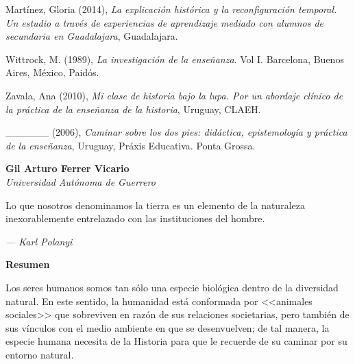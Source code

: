  
Martínez, Gloria (2014), \textit{La explicación histórica y la reconfiguración 
temporal. Un estudio a través de experiencias de aprendizaje mediado 
con alumnos de secundaria en Guadalajara}, Guadalajara.

 
Wittrock, M. (1989), \textit{La investigación de la enseñanza}. Vol I. 
Barcelona, Buenos Aires, México, Paidós.

 
Zavala, Ana (2010), \textit{Mi clase de historia bajo la lupa. Por un abordaje 
clínico de la práctica de la enseñanza de la historia}, Uruguay, CLAEH\@.

 
\_\_\_\_\_\_ (2006), \textit{Caminar sobre los dos pies: didáctica, 
epistemología y práctica de la enseñanza}, Uruguay, Práxis Educativa. 
Ponta Grossa.

%

\thispagestyle{empty}	
{}
{}


\bigskip
\begin{center}
{\bfseries Gil Arturo Ferrer Vicario}\\
{\itshape Universidad Autónoma de Guerrero}
\end{center}

\medskip
\epigraph{Lo que nosotros denominamos la tierra es un 
elemento de la naturaleza inexorablemente entrelazado con las 
instituciones del hombre.}{\itshape — Karl Polanyi}

\bigskip
{\bfseries Resumen}

Los seres humanos somos tan sólo una especie biológica dentro de la 
diversidad natural. En este sentido, la humanidad está conformada por 
<<animales sociales>> que sobreviven en razón de sus relaciones 
societarias, pero también de sus vínculos con el medio ambiente en que 
se desenvuelven; de tal manera, la especie humana necesita de la 
Historia para que le recuerde de su caminar por su entorno natural.

